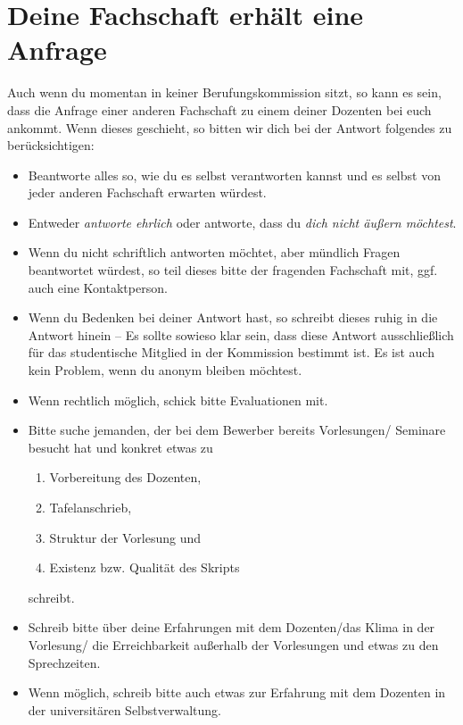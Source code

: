 \documentclass[10pt,twoside,a5paper,openright]{book}
\begin{document}
\section{Deine Fachschaft erhält eine Anfrage}
Auch wenn du momentan in keiner Berufungskommission sitzt, so kann es sein, dass die Anfrage einer anderen Fachschaft zu einem deiner Dozenten bei euch ankommt. Wenn dieses geschieht, so bitten wir dich bei der Antwort folgendes zu berücksichtigen:
\begin{itemize}
	\item Beantworte alles so, wie du es selbst verantworten kannst und es selbst von jeder anderen Fachschaft erwarten würdest.
	\item Entweder \emph{antworte ehrlich} oder antworte, dass du \emph{dich nicht äußern möchtest}.
	\item Wenn du nicht schriftlich antworten möchtet, aber mündlich Fragen beantwortet würdest, so teil dieses bitte der fragenden Fachschaft mit, ggf. auch eine Kontaktperson.
	\item Wenn du Bedenken bei deiner Antwort hast, so schreibt dieses ruhig in die Antwort hinein -- Es sollte sowieso klar sein, dass diese Antwort ausschließlich für das studentische Mitglied in der Kommission bestimmt ist. Es ist auch kein Problem, wenn du anonym bleiben möchtest.
	\item Wenn rechtlich möglich, schick bitte Evaluationen mit.
	\item Bitte suche jemanden, der bei dem Bewerber bereits Vorlesungen/ Seminare besucht hat und konkret etwas zu
	\begin{enumerate}
		\item Vorbereitung des Dozenten,
		\item Tafelanschrieb,
		\item Struktur der Vorlesung und
		\item Existenz bzw. Qualität des Skripts
	\end{enumerate}
	schreibt.
	\item Schreib bitte über deine Erfahrungen mit dem Dozenten/das Klima in der Vorlesung/ die Erreichbarkeit außerhalb der Vorlesungen und etwas zu den Sprechzeiten.
	\item Wenn möglich, schreib bitte auch etwas zur Erfahrung mit dem Dozenten in der universitären Selbstverwaltung.
\end{itemize}



\end{document}
